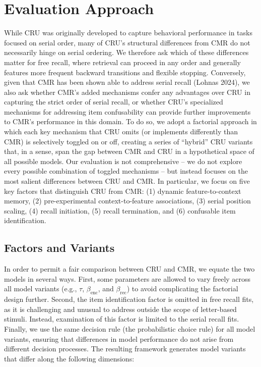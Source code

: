 \documentclass[
  letterpaper,
  11pt,
  english,
  singlespacing,
  headsepline]{MastersDoctoralThesis}
\begin{document}
\section{Evaluation Approach}\label{evaluation-approach}

While CRU was originally developed to capture behavioral performance in
tasks focused on serial order, many of CRU's structural differences from
CMR do not necessarily hinge on serial ordering. We therefore ask which
of these differences matter for free recall, where retrieval can proceed
in any order and generally features more frequent backward transitions
and flexible stopping. Conversely, given that CMR has been shown able to
address serial recall (Lohnas 2024), we also ask whether CMR's added
mechanisms confer any advantages over CRU in capturing the strict order
of serial recall, or whether CRU's specialized mechanisms for addressing
item confusability can provide further improvements to CMR's performance
in this domain. To do so, we adopt a factorial approach in which each
key mechanism that CRU omits (or implements differently than CMR) is
selectively toggled on or off, creating a series of ``hybrid'' CRU
variants that, in a sense, span the gap between CMR and CRU in a
hypothetical space of all possible models. Our evaluation is not
comprehensive -- we do not explore every possible combination of toggled
mechanisms -- but instead focuses on the most salient differences
between CRU and CMR. In particular, we focus on five key factors that
distinguish CRU from CMR: (1) dynamic feature-to-context memory, (2)
pre-experimental context-to-feature associations, (3) serial position
scaling, (4) recall initiation, (5) recall termination, and (6)
confusable item identification.

\subsection{Factors and Variants}\label{factors-and-variants}

In order to permit a fair comparison between CRU and CMR, we equate the
two models in several ways. First, some parameters are allowed to vary
freely across all model variants (e.g., \(\tau\), \(\beta_\text{enc}\),
and \(\beta_\text{rec}\)) to avoid complicating the factorial design
further. Second, the item identification factor is omitted in free
recall fits, as it is challenging and unusual to address outside the
scope of letter-based stimuli. Instead, examination of this factor is
limited to the serial recall fits. Finally, we use the same decision
rule (the probabilistic choice rule) for all model variants, ensuring
that differences in model performance do not arise from different
decision processes. The resulting framework generates model variants
that differ along the following dimensions:
\end{document}
